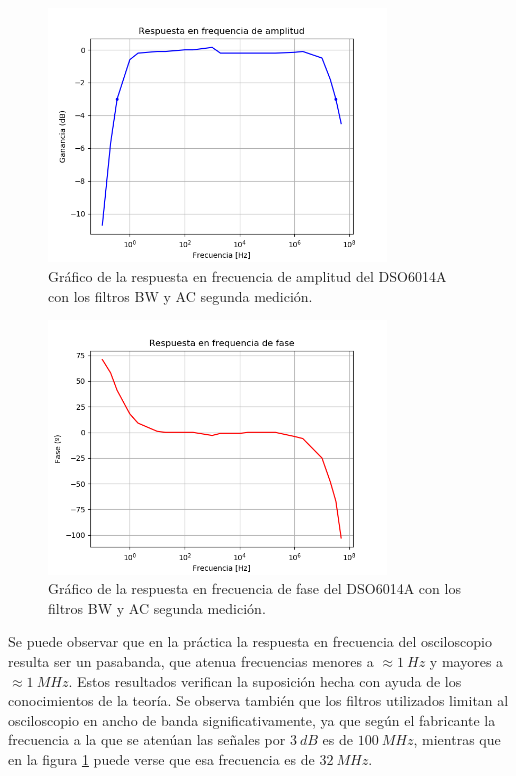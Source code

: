 \documentclass[11pt, a4paper]{article}
\begin{document}
\begin{figure}[H]
	\centering
	\includegraphics[width=0.8\textwidth]{resp_freq_osci1.png}
	\caption{Gráfico de la respuesta en frecuencia de amplitud del DSO6014A con los filtros BW y AC segunda medición.}  
	\label{graf:resp_freq_osci1}
\end{figure}

\begin{figure}[H]
	\centering
	\includegraphics[width=0.8\textwidth]{resp_freq_osci2.png}
	\caption{Gráfico de la respuesta en frecuencia de fase del DSO6014A con los filtros BW y AC segunda medición.} 
	\label{graf:resp_freq_osci2}
\end{figure}

Se puede observar que en la práctica la respuesta en frecuencia del osciloscopio resulta ser un pasabanda, que atenua frecuencias menores a $\approx 1 \ Hz$ y mayores a $\approx 1 \ MHz$. Estos resultados verifican la suposición hecha con ayuda de los conocimientos de la teoría. Se observa también que los filtros utilizados limitan al osciloscopio en ancho de banda significativamente, ya que según el fabricante la frecuencia a la que se atenúan las señales por $3 \ dB$ es de $100 \ MHz$, mientras que en la figura \ref{graf:resp_freq_osci1} puede verse que esa frecuencia es de $32 \ MHz$.
\end{document}
